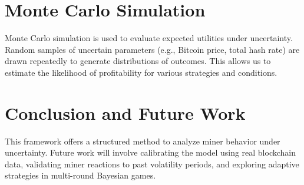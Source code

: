 \documentclass[12pt]{article}
\begin{document}
\section{Monte Carlo Simulation}
Monte Carlo simulation is used to evaluate expected utilities under uncertainty. Random samples of uncertain parameters (e.g., Bitcoin price, total hash rate) are drawn repeatedly to generate distributions of outcomes. This allows us to estimate the likelihood of profitability for various strategies and conditions.

\section{Conclusion and Future Work}
This framework offers a structured method to analyze miner behavior under uncertainty. Future work will involve calibrating the model using real blockchain data, validating miner reactions to past volatility periods, and exploring adaptive strategies in multi-round Bayesian games.



\end{document}

